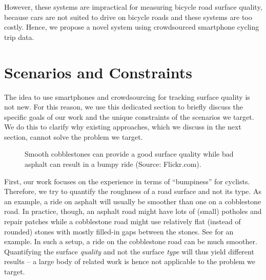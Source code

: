 However, these systems are impractical for measuring bicycle road surface quality, because cars are not suited to drive on bicycle roads and these systems are too costly.
Hence, we propose a novel system using crowdsourced smartphone cycling trip data.

\section{Scenarios and Constraints}
\label{sec:scenarios_and_constraints}
The idea to use smartphones and crowdsourcing for tracking surface quality is not new.
For this reason, we use this dedicated section to briefly discuss the specific goals of our work and the unique constraints of the scenarios we target.
We do this to clarify why existing approaches, which we discuss in the next section, cannot solve the problem we target.

\begin{figure}[t]
    \centering
    \hfill
    \caption{%
        Smooth cobblestones can provide a good surface quality while bad asphalt can result in a bumpy ride (Source: Flickr.com).
    }%
    \label{fig:cobblestone_vs_asphalt}
\end{figure}

First, our work focuses on the experience in terms of ``bumpiness'' for cyclists.
Therefore, we try to quantify the roughness of a road surface and not its type.
As an example, a ride on asphalt will usually be smoother than one on a cobblestone road.
In practice, though, an asphalt road might have lots of (small) potholes and repair patches while a cobblestone road might use relatively flat (instead of rounded) stones  with mostly filled-in gaps between the stones.
See  for an example.
In such a setup, a ride on the cobblestone road can be much smoother.
Quantifying the surface \emph{quality} and not the surface \emph{type} will thus yield different results -- a large body of related work is hence not applicable to the problem we target.

